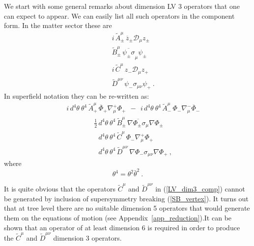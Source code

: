\documentclass[paper,12pt]{revtex4}
\begin{document}
	We start with some general remarks about dimension LV 3 operators 
	that one can expect to appear. 
	We can easily list all such operators in the component form. In the matter sector these
	are
\begin{eqnarray}
\nonumber
	&& i\, \widetilde{A}_\pm^\mu\, \overline{z}_\pm 
		\mathcal{D}_\mu z_\pm \\
\label{LV_dim3_comp}
	&& \widetilde{B}_\pm^\mu\, \overline{\psi_\pm\sigma}_\mu 
		   		   \psi_\pm \\
\nonumber
	&& i\, \widetilde{C}^\mu\, z_- \mathcal{D}_\mu z_+ \\
\nonumber
	&& \widetilde{D}^{\mu\nu}\, \psi_- \sigma_{\mu\nu} 
		 		    \psi_+~.
\end{eqnarray}
	In superfield notation they can be re-written as:
\begin{eqnarray}
\nonumber
&&
	i\,  d^4\theta~ \theta^4\, \widetilde{A}_+^\mu\, 
	\overline{\Phi}_+ \nabla^+_\mu \Phi_+
	~~-~~
	i\,  d^4\theta~ \theta^4\, \widetilde{A}_-^\mu\, \Phi_- 
	                        \nabla^-_\mu 
		  	  \overline{\Phi}_-  \\
\label{LV_dim3}
&&
	\qquad
	\qquad
	\frac{1}{2}\,
	 d^4\theta~ \theta^4\, \widetilde{B}_\pm^\mu\, 
	\overline{\nabla \Phi_\pm \sigma_\mu} \nabla \Phi_\pm \\
\nonumber
&&
	\qquad
	\qquad
	\phantom{\frac{1}{2}\,}
	d^4\theta~ \theta^4\, \widetilde{C}^\mu\, 
			\Phi_- \nabla_\mu^+ \Phi_+ \\
\nonumber 
&&
	\qquad
	\qquad
	\phantom{\frac{1}{2}\,}
	d^4\theta~ \theta^4\, \widetilde{D}^{\mu\nu}\,
		\nabla \Phi_- \sigma_{\mu\nu} \nabla \Phi_+~, 
\end{eqnarray}
	where
\[
	\theta^4 = \theta^2 \bar\theta^2~.
\]

	It is quite obvious that the operators $ \widetilde{C}^\mu $
	and $ \widetilde{D}^{\mu\nu} $ in (\ref{LV_dim3_comp}) cannot
	be generated by inclusion of supersymmetry breaking (\ref{SB_vertex}). 
	It turns out that at tree level there are no suitable dimension 5 operators
	that would generate them on the equations of motion
	(see Appendix~\ref{app_reduction}).It can be shown that an operator 
    of at least dimension 6 is required 
	in order to produce the $ \widetilde{C}^\mu $
	and $ \widetilde{D}^{\mu\nu} $ dimension 3 operators.
\end{document}
